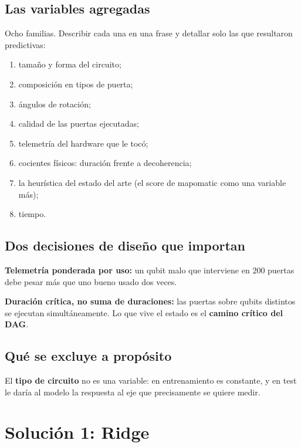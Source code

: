 \subsection{Las variables agregadas}
\label{sec:features}
Ocho familias. Describir cada una en una frase y detallar solo las que resultaron
predictivas:
\begin{enumerate}
    \item tamaño y forma del circuito;
    \item composición en tipos de puerta;
    \item ángulos de rotación;
    \item calidad de las puertas ejecutadas;
    \item telemetría del hardware que le tocó;
    \item cocientes físicos: duración frente a decoherencia;
    \item la heurística del estado del arte (el score de mapomatic como una variable más);
    \item tiempo.
\end{enumerate}

\subsection{Dos decisiones de diseño que importan}
\textbf{Telemetría ponderada por uso:} un qubit malo que interviene en $200$ puertas debe pesar
más que uno bueno usado dos veces.

\textbf{Duración crítica, no suma de duraciones:} las puertas sobre qubits distintos se
ejecutan simultáneamente. Lo que vive el estado es el \textbf{camino crítico del DAG}.

\subsection{Qué se excluye a propósito}
El \textbf{tipo de circuito} no es una variable: en entrenamiento es constante, y en test le
daría al modelo la respuesta al eje que precisamente se quiere medir.


\section{Solución 1: Ridge}
\label{sec:ridge}
